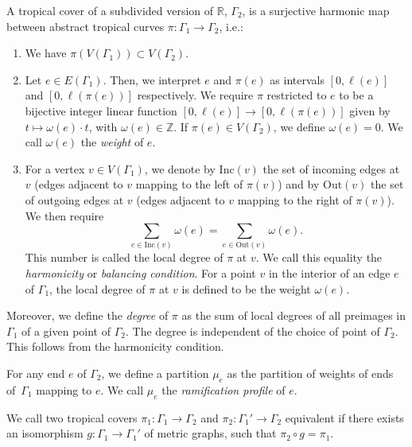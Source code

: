 \documentclass[ALCO,published]{cedram}
\begin{document}
\begin{defi}
A tropical cover of a subdivided version of $\mathbb{R}$, $\Gamma_2$, is a surjective harmonic map between abstract tropical curves $\pi\colon \Gamma_1\to\Gamma_2$, i.e.:
\begin{enumerate}
    \item We have $\pi(V(\Gamma_1))\subset V(\Gamma_2)$.
    \item Let $e\in E(\Gamma_1)$. Then, we interpret $e$ and $\pi(e)$ as intervals $[0,\ell(e)]$ and $[0,\ell(\pi(e))]$ respectively. We require $\pi$ restricted to $e$ to be a bijective integer linear function $[0,\ell(e)]\to[0,\ell(\pi(e))]$ given by $t\mapsto \omega(e)\cdot t$, with $\omega(e) \in \mathbb{Z}$. If $\pi(e)\in V(\Gamma_2)$, we define $\omega(e)=0$. We call $\omega(e)$ the \textit{weight} of $e$.
    \item For a vertex $v\in V(\Gamma_1)$, we denote by $\mathrm{Inc}(v)$ the set of incoming edges at $v$ (edges adjacent to $v$ mapping to the left of $\pi(v)$) and by $\mathrm{Out}(v)$ the set of outgoing edges at $v$ (edges adjacent to $v$ mapping to the right of $\pi(v)$). We then require
    \begin{equation*}
            \sum_{e\in\mathrm{Inc}(v)}\omega(e)=\sum_{e\in\mathrm{Out}(v)}\omega(e).
    \end{equation*}
    This number is called the local degree of $\pi$ at $v$.
    We call this equality the \textit{harmonicity} or \textit{balancing condition}.
    For a point $v$ in the interior of an edge $e$ of $\Gamma_1$, the local degree of $\pi$ at $v$ is defined to be the weight $\omega(e)$.
\end{enumerate}
Moreover, we define the \textit{degree} of $\pi$ as the sum of local degrees of all preimages in $\Gamma_1$ of a given point of $\Gamma_2$. The degree is independent of the choice of point of $\Gamma_2$. This follows from the harmonicity condition.

For any end $e$ of $\Gamma_2$, we define a partition $\mu_e$ as the partition of weights of ends of~$\Gamma_1$ mapping to $e$. We call $\mu_e$ the \textit{ramification profile} of $e$.

We call two tropical covers $\pi_1\colon\Gamma_1\to\Gamma_2$ and $\pi_2\colon\Gamma_1'\to\Gamma_2$ equivalent if there exists an isomorphism $g\colon\Gamma_1\to\Gamma_1'$ of metric graphs, such that $\pi_2\circ g=\pi_1$.
\end{defi}
\end{document}
